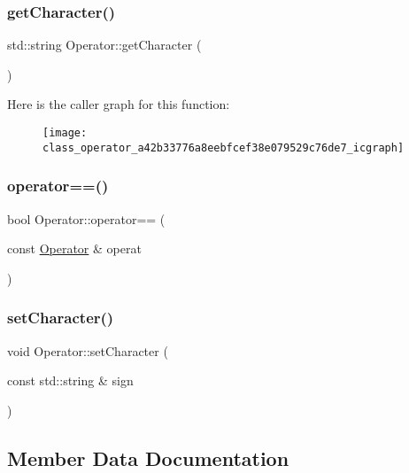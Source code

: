 \subsubsection{\texorpdfstring{getCharacter()}{getCharacter()}}
{\footnotesize\ttfamily std\+::string Operator\+::get\+Character (\begin{DoxyParamCaption}{ }\end{DoxyParamCaption})}

Here is the caller graph for this function\+:
\nopagebreak
\begin{figure}[H]
\begin{center}
\leavevmode
\texttt{[image: class\_operator\_a42b33776a8eebfcef38e079529c76de7\_icgraph]}
\end{center}
\end{figure}
\mbox{\label{class_operator_abcd957826cbbf7c0f06cb1f7a7673d90}} 
\subsubsection{\texorpdfstring{operator==()}{operator==()}}
{\footnotesize\ttfamily bool Operator\+::operator== (\begin{DoxyParamCaption}\item[{const \mbox{\hyperlink{class_operator}{Operator}} \&}]{operat }\end{DoxyParamCaption})}

\mbox{\label{class_operator_a170fb2b4847b20ca2fc73d95ed2762e7}} 
\subsubsection{\texorpdfstring{setCharacter()}{setCharacter()}}
{\footnotesize\ttfamily void Operator\+::set\+Character (\begin{DoxyParamCaption}\item[{const std\+::string \&}]{sign }\end{DoxyParamCaption})}



\subsection{Member Data Documentation}
\mbox{\label{class_operator_a41e2e93ec8631a2366423aba34fe3cae}} 

